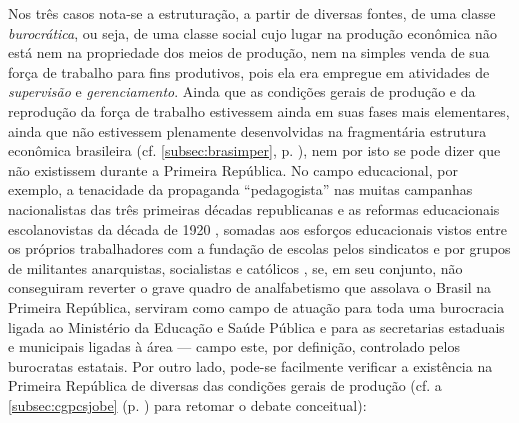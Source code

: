 Nos três casos nota-se a estruturação, a partir de diversas fontes, de uma classe \textit{burocrática}, ou seja, de uma classe social cujo lugar na produção econômica não está nem na propriedade dos meios de produção, nem na simples venda de sua força de trabalho para fins produtivos, pois ela era empregue em atividades de \textit{supervisão} e \textit{gerenciamento}. Ainda que as condições gerais de produção e da reprodução da força de trabalho estivessem ainda em suas fases mais elementares, ainda que não estivessem plenamente desenvolvidas na fragmentária estrutura econômica brasileira (cf. \autoref{subsec:brasimper}, p. \pageref{subsec:brasimper}), nem por isto se pode dizer que não existissem durante a Primeira República. No campo educacional, por exemplo, a tenacidade da propaganda ``pedagogista'' nas muitas campanhas nacionalistas das três primeiras décadas republicanas e as reformas educacionais escolanovistas da década de 1920 \cite{nagle_educacao_1977}, somadas aos esforços educacionais vistos entre os próprios trabalhadores com a fundação de escolas pelos sindicatos e por grupos de militantes anarquistas, socialistas e católicos \cite{andradeneto_educana_2014,ghiraldelli_educmovop_1987}, se, em seu conjunto, não conseguiram reverter o grave quadro de analfabetismo que assolava o Brasil na Primeira República, serviram como campo de atuação para toda uma burocracia ligada ao Ministério da Educação e Saúde Pública e para as secretarias estaduais e municipais ligadas à área --- campo este, por definição, controlado pelos burocratas estatais. Por outro lado, pode-se facilmente verificar a existência na Primeira República de diversas das condições gerais de produção (cf. a \autoref{subsec:cgpcsjobe} (p. \pageref{subsec:cgpcsjobe}) para retomar o debate conceitual):

